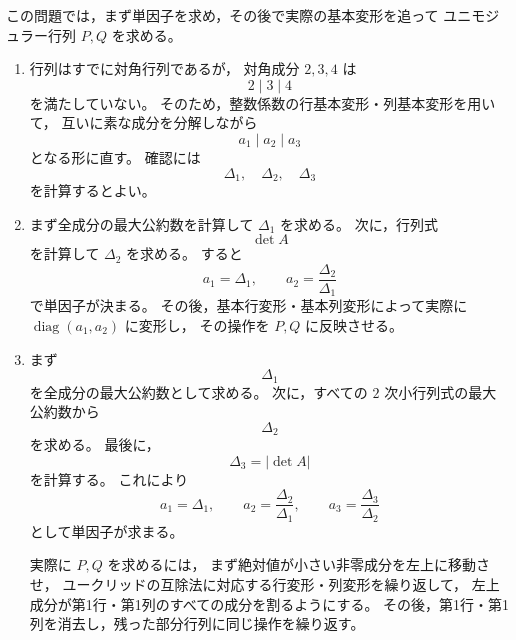 \begin{strategy}
	この問題では，まず単因子を求め，その後で実際の基本変形を追って
	ユニモジュラー行列 \(P,Q\) を求める。
	
	\begin{enumerate}
		\item[(1)]
		行列はすでに対角行列であるが，
		対角成分 \(2,3,4\) は
		\[
		2\mid 3\mid 4
		\]
		を満たしていない。
		そのため，整数係数の行基本変形・列基本変形を用いて，
		互いに素な成分を分解しながら
		\[
		a_1\mid a_2\mid a_3
		\]
		となる形に直す。
		確認には
		\[
		\Delta_1,\quad \Delta_2,\quad \Delta_3
		\]
		を計算するとよい。
		
		\item[(2)]
		まず全成分の最大公約数を計算して \(\Delta_1\) を求める。
		次に，行列式
		\[
		\det A
		\]
		を計算して \(\Delta_2\) を求める。
		すると
		\[
		a_1=\Delta_1,
		\qquad
		a_2=\frac{\Delta_2}{\Delta_1}
		\]
		で単因子が決まる。
		その後，基本行変形・基本列変形によって実際に
		\(\operatorname{diag}(a_1,a_2)\) に変形し，
		その操作を \(P,Q\) に反映させる。
		
		\item[(3)]
		まず
		\[
		\Delta_1
		\]
		を全成分の最大公約数として求める。
		次に，すべての \(2\) 次小行列式の最大公約数から
		\[
		\Delta_2
		\]
		を求める。
		最後に，
		\[
		\Delta_3=|\det A|
		\]
		を計算する。
		これにより
		\[
		a_1=\Delta_1,
		\qquad
		a_2=\frac{\Delta_2}{\Delta_1},
		\qquad
		a_3=\frac{\Delta_3}{\Delta_2}
		\]
		として単因子が求まる。
		
		実際に \(P,Q\) を求めるには，
		まず絶対値が小さい非零成分を左上に移動させ，
		ユークリッドの互除法に対応する行変形・列変形を繰り返して，
		左上成分が第1行・第1列のすべての成分を割るようにする。
		その後，第1行・第1列を消去し，残った部分行列に同じ操作を繰り返す。
	\end{enumerate}
\end{strategy}